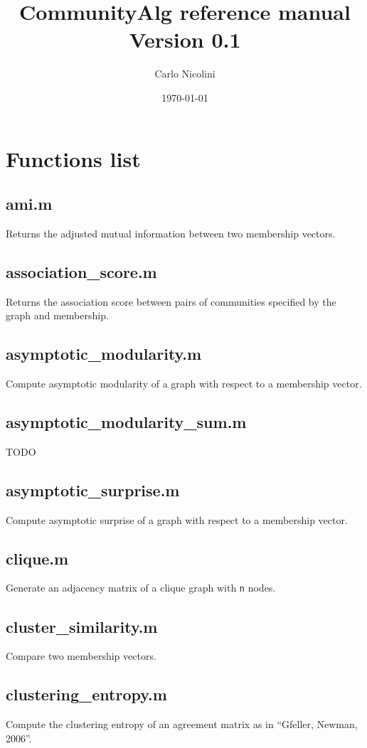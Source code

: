 \documentclass[a4paper]{report}
\title{CommunityAlg reference manual\\Version 0.1}
\author{Carlo Nicolini}
\date{\today}
\begin{document}
\maketitle

\section*{Functions list}\label{matlaboctave-algorithms-and-functions}


  \subsection*{ami.m} Returns the adjusted mutual information between two
  membership vectors.

  \subsection*{association\_score.m} Returns the association score between
  pairs of communities specified by the graph and membership.

  \subsection*{asymptotic\_modularity.m} Compute asymptotic modularity of a
  graph with respect to a membership vector.

  \subsection*{asymptotic\_modularity\_sum.m} TODO

  \subsection*{asymptotic\_surprise.m} Compute asymptotic surprise of a graph
  with respect to a membership vector.

  \subsection*{clique.m} Generate an adjacency matrix of a clique graph with
  \texttt{n} nodes.

  \subsection*{cluster\_similarity.m} Compare two membership vectors.

  \subsection*{clustering\_entropy.m} Compute the clustering entropy of an
  agreement matrix as in ``Gfeller, Newman, 2006''.
\end{document}
